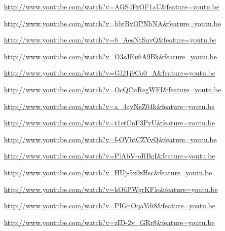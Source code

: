 \documentclass[12pt,a4paper]{article}
\begin{document}
\url{http://www.youtube.com/watch?v=AGS4FzOF1aU&feature=youtu.be}



\url{http://www.youtube.com/watch?v=hbtBvOPNhNA&feature=youtu.be}

\url{http://www.youtube.com/watch?v=6_AesNtSnvQ&feature=youtu.be}

\url{http://www.youtube.com/watch?v=O3sJEu6A9Bk&feature=youtu.be}

\url{http://www.youtube.com/watch?v=GI21j9Co0_A&feature=youtu.be}

\url{http://www.youtube.com/watch?v=OcQCuRegWEI&feature=youtu.be}

\url{http://www.youtube.com/watch?v=a_4ayNeZ04k&feature=youtu.be}

\url{http://www.youtube.com/watch?v=t1etCnF3PyU&feature=youtu.be}

\url{http://www.youtube.com/watch?v=f-OVbtCZYvQ&feature=youtu.be}

\url{http://www.youtube.com/watch?v=PlAbV-oRBgI&feature=youtu.be}

\url{http://www.youtube.com/watch?v=HUj-5x0zHsc&feature=youtu.be}

\url{http://www.youtube.com/watch?v=kO6PWgrKFlo&feature=youtu.be}

\url{http://www.youtube.com/watch?v=PIGnOqaYdi8&feature=youtu.be}

\url{http://www.youtube.com/watch?v=zID-2y_GRr8&feature=youtu.be}

 
\end{document}
